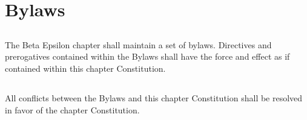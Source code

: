 \chapter{Bylaws}\label{sec:bylaws}

\section{}
The Beta Epsilon chapter shall maintain a set of bylaws. Directives and prerogatives contained within the Bylaws shall have the force and effect as if contained within this chapter Constitution.

\section{}
All conflicts between the Bylaws and this chapter Constitution shall be resolved in favor of the chapter Constitution.



